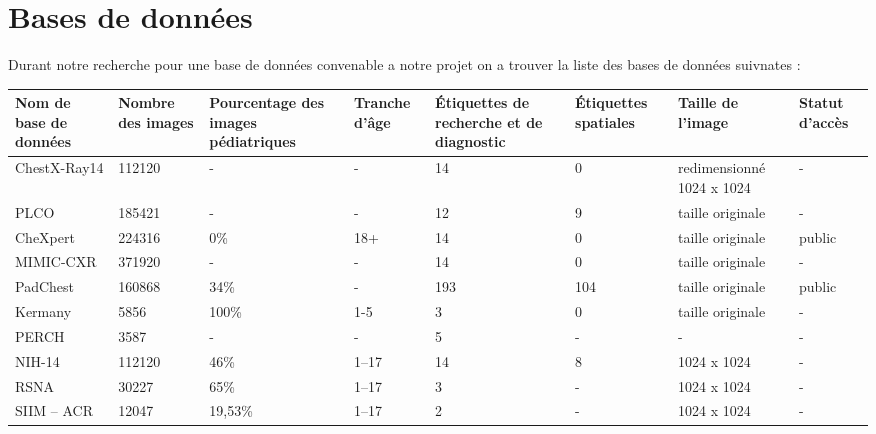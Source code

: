 \section{Bases de données}
    Durant notre recherche pour une base de données convenable a notre projet on a trouver la liste des bases de données suivnates :
    \begin{table}[H]
        \centering
        \scriptsize
        \begin{tabularx}{\textwidth}{ |X|X|X|X|X|X|X|X| } 
            \hline
            \hfil Nom de base de données & \hfil Nombre des images & \hfil Pourcentage des images pédiatriques & \hfil Tranche d'âge & \hfil Étiquettes de recherche et de diagnostic & Étiquettes 
            \hfil spatiales & \hfil Taille de l'image & \hfil Statut d'accès\\ [1ex]
            \hline
            \hfil ChestX-Ray14 & \hfil 112120 & \hfil - & \hfil - & \hfil 14 & \hfil 0 & \hfil redimensionné 1024 x 1024 & \hfil - \\ 
            \hline
            \hfil PLCO & \hfil 185421 & \hfil - & \hfil - & \hfil 12 & \hfil 9 & \hfil taille originale & \hfil - \\ 
            \hline
            \hfil CheXpert & \hfil 224316 & \hfil 0\% & \hfil 18+ & \hfil 14 & \hfil 0 & \hfil taille originale & \hfil public \\ 
            \hline
            \hfil MIMIC-CXR & \hfil 371920 & \hfil - & \hfil - & \hfil 14 & \hfil 0 & \hfil taille originale & \hfil - \\ 
            \hline
            \hfil PadChest & \hfil 160868 & \hfil 34\% & \hfil - & \hfil 193 & \hfil 104 & \hfil taille originale & \hfil public \\
            \hline
            \hfil Kermany & \hfil 5856 & \hfil 100\% & \hfil 1-5 & \hfil 3 & \hfil 0 & \hfil taille originale & \hfil - \\ 
            \hline
            \hfil PERCH & \hfil 3587 & \hfil - & \hfil - & \hfil 5 & \hfil - & \hfil - & \hfil - \\
            \hline
            \hfil NIH-14 & \hfil 112120 & \hfil 46\% & \hfil 1–17 & \hfil 14 & \hfil 8 & \hfil 1024 x 1024 & \hfil - \\
            \hline
            \hfil RSNA & \hfil 30227 & \hfil 65\% & \hfil 1–17 & \hfil 3 & \hfil - & \hfil 1024 x 1024 & \hfil - \\
            \hline
            \hfil SIIM – ACR & \hfil 12047 & \hfil 19,53\% & \hfil 1–17 & \hfil 2 & \hfil - & \hfil 1024 x 1024 & \hfil - \\

\end{tabularx}
\end{table}
